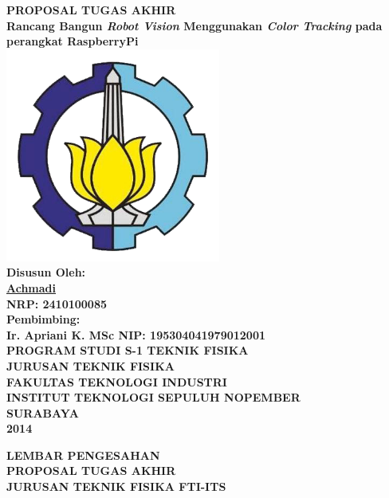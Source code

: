 \documentclass[a4paper,12pt]{article}
\title{}
\author{}
\date{}
\begin{document}
\begin{center}
  \textbf{ \Large{PROPOSAL TUGAS AKHIR } }\\[5pt]
  \textbf{ \large{Rancang Bangun \textit{Robot Vision} Menggunakan \textit{Color Tracking} pada perangkat RaspberryPi } }
  \\[50pt]
  \includegraphics[width=200pt]{ITS}
  \\[50pt]
  \textbf{ \large{Disusun Oleh:} }\\
  \underline{\textbf{ \large{Achmadi} } }\\
  \textbf{ \large{NRP: 2410100085 } }\\[40pt]
  \textbf{ \large{Pembimbing: } }\\
  \textbf{ \large{Ir. Apriani K. MSc \hspace{50pt} NIP: 195304041979012001} }\\[60pt]
  \textbf{ \large{PROGRAM STUDI S-1 TEKNIK FISIKA } }\\
  \textbf{ \large{JURUSAN TEKNIK FISIKA } }\\
  \textbf{ \large{FAKULTAS TEKNOLOGI INDUSTRI } }\\
  \textbf{ \large{INSTITUT TEKNOLOGI SEPULUH NOPEMBER } }\\
  \textbf{ \large{SURABAYA } }\\
  \textbf{ \large{2014 } }\\
\end{center}
\newpage
\begin{center}
  \textbf{ LEMBAR PENGESAHAN  }\\[5pt]
  \textbf{ PROPOSAL TUGAS AKHIR  } \\[5pt]
  \textbf{ JURUSAN TEKNIK FISIKA FTI-ITS  }\\[5pt]
\end{center}
\end{document}
